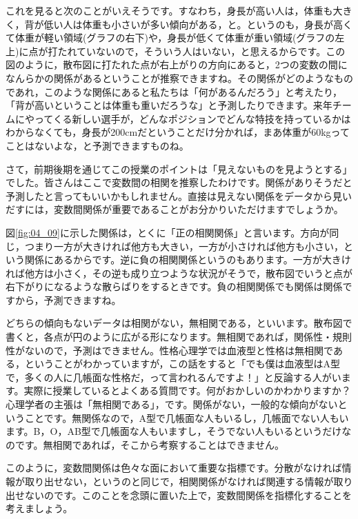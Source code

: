 \documentclass{ltjbook}
\begin{document}
これを見ると次のことがいえそうです。すなわち，身長が高い人は，体重も大きく，背が低い人は体重も小さいが多い傾向がある，と。というのも，身長が高くて体重が軽い領域(グラフの右下)や，身長が低くて体重が重い領域(グラフの左上)に点が打たれていないので，そういう人はいない，と思えるからです。この図のように，散布図に打たれた点が右上がりの方向にあると，2つの変数の間になんらかの関係があるということが推察できますね。その関係がどのようなものであれ，このような関係にあると私たちは「何があるんだろう」と考えたり，「背が高いということは体重も重いだろうな」と予測したりできます。来年チームにやってくる新しい選手が，どんなポジションでどんな特技を持っているかはわからなくても，身長が200cmだということだけ分かれば，まあ体重が60kgってことはないよな，と予測できますものね。

さて，前期後期を通じてこの授業のポイントは「見えないものを見ようとする」でした。皆さんはここで変数間の相関を推察したわけです。関係がありそうだと予測したと言ってもいいかもしれません。直接は見えない関係をデータから見いだすには，変数間関係が重要であることがお分かりいただけますでしょうか。

図\ref{fig:04_09}に示した関係は，とくに「正の相関関係」と言います。方向が同じ，つまり一方が大きければ他方も大きい，一方が小さければ他方も小さい，という関係にあるからです。逆に負の相関関係というのもあります。一方が大きければ他方は小さく，その逆も成り立つような状況がそうで，散布図でいうと点が右下がりになるような散らばりをするときです。負の相関関係でも関係は関係ですから，予測できますね。

どちらの傾向もないデータは相関がない，無相関である，といいます。散布図で書くと，各点が円のように広がる形になります。無相関であれば，関係性・規則性がないので，予測はできません。性格心理学では血液型と性格は無相関である，ということがわかっていますが，この話をすると「でも僕は血液型はA型で，多くの人に几帳面な性格だ，って言われるんですよ！」と反論する人がいます。実際に授業しているとよくある質問です。何がおかしいのかわかりますか？ 心理学者の主張は「無相関である」，です。関係がない，一般的な傾向がないということです。無関係なので，A型で几帳面な人もいるし，几帳面でない人もいます。B，O，AB型で几帳面な人もいますし，そうでない人もいるというだけなのです。無相関であれば，そこから考察することはできません。

このように，変数間関係は色々な面において重要な指標です。分散がなければ情報が取り出せない，というのと同じで，相関関係がなければ関連する情報が取り出せないのです。このことを念頭に置いた上で，変数間関係を指標化することを考えましょう。
\end{document}
